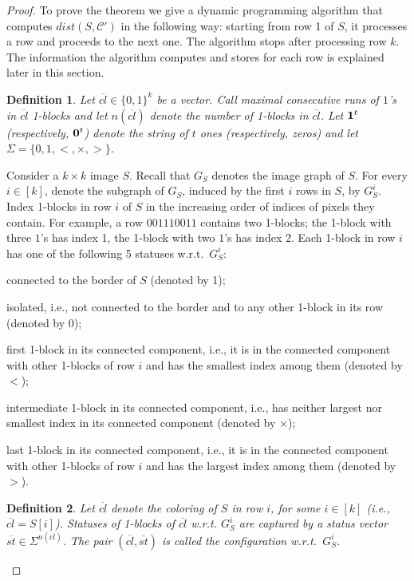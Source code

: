 \documentclass[11pt,english]{article}
\renewenvironment{itemize}[1]{\begin{compactitem}#1}{\end{compactitem}}
\newtheorem{definition}{Definition}[section]
\numberwithin{figure}{section}
\newcommand{\C}{{\mathcal C}}
\newcommand{\dis}{dist}
\begin{document}
\begin{proof}{\color{black}
To prove the theorem we give a dynamic programming algorithm that computes $\dis(S,\C')$ in the following way: starting from row 1 of $S$, it processes a row and proceeds to the next one. The algorithm stops after processing row $k$. The information the algorithm computes and stores for each row is explained later in this section.

\begin{definition}
\label{def:block}
Let $\overline{cl}\in\{0,1\}^k$ be a vector. Call maximal consecutive runs of $1$'s in $\overline{cl}$ {\em 1-blocks} and let $n(\overline{cl})$ denote the number of 1-blocks in $\overline{cl}$. Let $\bold{1}^t$ (respectively, $\bold{0}^t$) denote the string of $t$ ones (respectively, zeros) and let $\Sigma=\{0,1,<,\times,>\}$.
\end{definition}
}

Consider a $k\times k$ image $S$. Recall that $G_{S}$ denotes the image graph of $S$. For every $i\in[k]$, denote the subgraph of $G_{S}$, induced by the first $i$ rows in $S$, by $G^i_{S}$. Index 1-blocks in row $i$ of $S$ in the increasing order of indices of pixels they contain. For example, a row $001110011$ contains two 1-blocks; the 1-block with three $1$'s  has index 1, the 1-block with two $1$'s has index 2. Each 1-block in row $i$ has one of the following 5 statuses w.r.t.\ $G^i_{S}$:
\begin{itemize}
\item{connected to the border of $S$ (denoted by 1);}
\item{isolated, i.e., not connected to the border and to any other 1-block in its row (denoted by 0);}
\item{first 1-block in its connected component, i.e., it is in the connected component with other 1-blocks of row $i$ and has the smallest index among them (denoted by $<$);}
\item{intermediate 1-block in its connected component, i.e., has neither largest nor smallest index in its connected component (denoted by $\times$);}
\item{last 1-block in its connected component, i.e., it is in the connected component with other 1-blocks of row $i$ and has the largest index among them (denoted by $>$).}
\end{itemize}

{\color{black}
\begin{definition}\label{def:config}
Let $\overline{cl}$ denote the coloring of $S$ in row $i$, for some $i\in[k]$ (i.e., $\overline{cl}=S[i]$). Statuses of 1-blocks of $\overline{cl}$ w.r.t. $G^i_S$ are captured by a {\em status vector} $\overline{st}\in\Sigma^{n(\overline{cl})}$. The pair $(\overline{cl},\overline{st})$ is called the {\em configuration w.r.t.\ $G^i_{S}$.}
\end{definition}

}
\end{proof}
\end{document}
